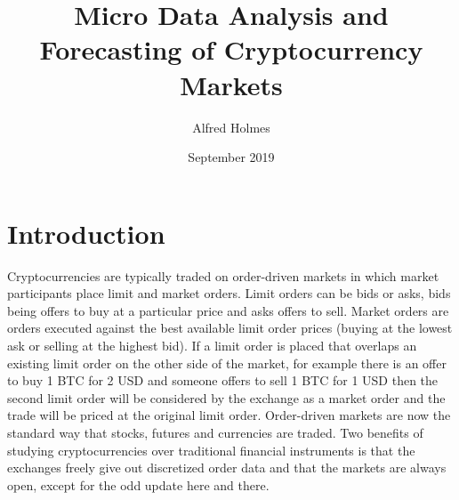 \documentclass[a4paper,10pt]{article}
\title{Micro Data Analysis and Forecasting of Cryptocurrency Markets}
\author{Alfred Holmes}
\date{September 2019}
\begin{document}
   \maketitle
\section{Introduction}
Cryptocurrencies are typically traded on order-driven markets in which market participants place limit and market orders. Limit orders can be bids or asks, bids being offers to buy at a particular price and asks offers to sell. Market orders are orders executed against the best available limit order prices (buying at the lowest ask or selling at the highest bid). If a limit order is placed that overlaps an existing limit order on the other side of the market, for example there is an offer to buy 1 BTC for 2 USD and someone offers to sell 1 BTC for 1 USD then the second limit order will be considered by the exchange as a market order and the trade will be priced at the original limit order. Order-driven markets are now the standard way that stocks, futures and currencies are traded. Two benefits of studying cryptocurrencies over traditional financial instruments is that the exchanges freely give out discretized order data and that the markets are always open, except for the odd update here and there.  \\ \\
\end{document}

